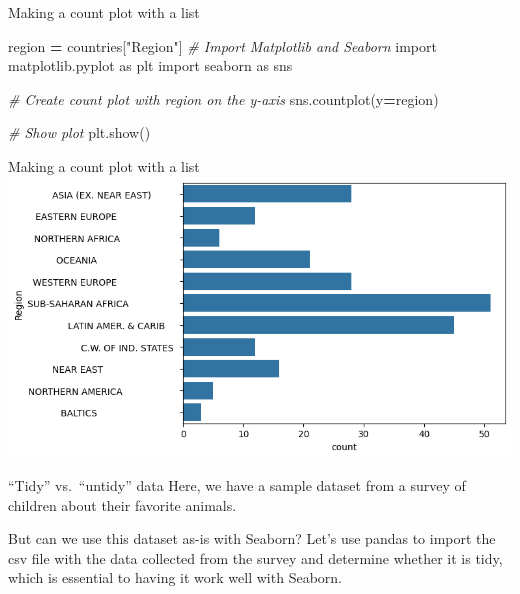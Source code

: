 \documentclass[
  ignorenonframetext,
]{beamer}
\newenvironment{Shaded}{\begin{snugshade}}{\end{snugshade}}
\newcommand{\CommentTok}[1]{\textcolor[rgb]{0.56,0.35,0.01}{\textit{#1}}}
\newcommand{\ImportTok}[1]{#1}
\newcommand{\NormalTok}[1]{#1}
\newcommand{\OperatorTok}[1]{\textcolor[rgb]{0.81,0.36,0.00}{\textbf{#1}}}
\newcommand{\StringTok}[1]{\textcolor[rgb]{0.31,0.60,0.02}{#1}}
\begin{document}
\begin{frame}[fragile]{Making a count plot with a list}
\label{making-a-count-plot-with-a-list-3}

\begin{Shaded}
\begin{Highlighting}[]
\NormalTok{region }\OperatorTok{=}\NormalTok{ countries[}\StringTok{"Region"}\NormalTok{]}
\CommentTok{\# Import Matplotlib and Seaborn}
\ImportTok{import}\NormalTok{ matplotlib.pyplot }\ImportTok{as}\NormalTok{ plt}
\ImportTok{import}\NormalTok{ seaborn }\ImportTok{as}\NormalTok{ sns}

\CommentTok{\# Create count plot with region on the y{-}axis}
\NormalTok{sns.countplot(y}\OperatorTok{=}\NormalTok{region)}

\CommentTok{\# Show plot}
\NormalTok{plt.show()}
\end{Highlighting}
\end{Shaded}
\end{frame}

\begin{frame}{Making a count plot with a list}
\label{making-a-count-plot-with-a-list-4}
\includegraphics{../images/im255.png}
\end{frame}

\begin{frame}{``Tidy'' vs.~``untidy'' data}
\label{tidy-vs.-untidy-data}
Here, we have a sample dataset from a survey of children about their
favorite animals.

But can we use this dataset as-is with Seaborn? Let's use pandas to
import the csv file with the data collected from the survey and
determine whether it is tidy, which is essential to having it work well
with Seaborn.
\end{frame}
\end{document}
